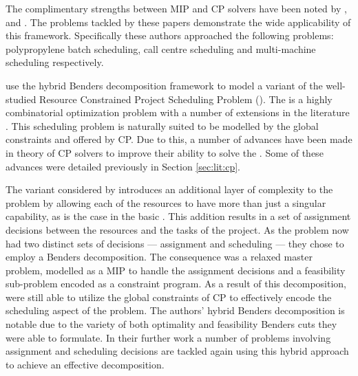 The complimentary strengths between MIP and CP solvers
have been noted by ,  
and .
The problems tackled by these papers
demonstrate the wide applicability of this framework.
Specifically these authors approached the
following problems: polypropylene batch scheduling,
call centre scheduling and multi-machine scheduling respectively.

 use the hybrid Benders decomposition
framework to model a variant of the well-studied
Resource Constrained Project Scheduling Problem (\RCPSP).
The \RCPSP is a highly combinatorial optimization problem 
with a number of extensions in the literature \cite{Szeredi2016,Tran2012}.
This scheduling problem is naturally suited to be modelled
by the global constraints \cumu and \disj offered by CP.
Due to this, a number of advances have been made in theory
of CP solvers to improve their ability to solve the \RCPSP.
Some of these advances were detailed previously
in Section \ref{sec:lit:cp}.

The variant considered by \citeauthor{Li2009a}
introduces an additional layer of complexity to the problem
by allowing each of the resources to have more than just 
a singular capability, as is the case in the basic \RCPSP.
This addition results in a set of assignment decisions
between the resources and the tasks of the project.
As the problem now had two distinct sets of decisions ---
assignment and scheduling --- they chose to employ
a Benders decomposition.
The consequence was a relaxed master problem, modelled as a MIP
to handle the assignment decisions and a feasibility sub-problem
encoded as a constraint program.
As a result of this decomposition, \citeauthor{Li2009a} were still able to utilize the 
global constraints of CP to effectively encode the scheduling aspect of the problem.
The authors' hybrid Benders decomposition is notable
due to the variety of both optimality and feasibility
Benders cuts they were able to formulate.
In their further work \cite{Li2009b,Li2012,Li2015} a number of
problems involving assignment and scheduling decisions
are tackled again using this hybrid approach to achieve
an effective decomposition.

